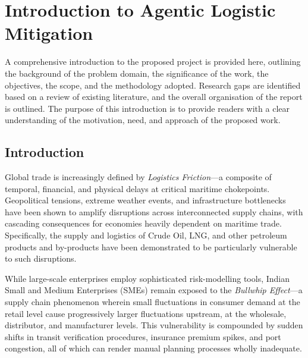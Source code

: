 \chapter{Introduction to Agentic Logistic Mitigation}
A comprehensive introduction to the proposed project is provided here, outlining the background of the problem domain, the significance of the work, the objectives, the scope, and the methodology adopted. Research gaps are identified based on a review of existing literature, and the overall organisation of the report is outlined. The purpose of this introduction is to provide readers with a clear understanding of the motivation, need, and approach of the proposed work.

\section[Introduction]{\textbf{Introduction}}
Global trade is increasingly defined by \textit{Logistics Friction}---a composite of temporal, financial, and physical delays at critical maritime chokepoints. Geopolitical tensions, extreme weather events, and infrastructure bottlenecks have been shown to amplify disruptions across interconnected supply chains, with cascading consequences for economies heavily dependent on maritime trade. Specifically, the supply and logistics of Crude Oil, LNG, and other petroleum products and by-products have been demonstrated to be particularly vulnerable to such disruptions.

While large-scale enterprises employ sophisticated risk-modelling tools, Indian Small and Medium Enterprises (SMEs) remain exposed to the \textit{Bullwhip Effect}---a supply chain phenomenon wherein small fluctuations in consumer demand at the retail level cause progressively larger fluctuations upstream, at the wholesale, distributor, and manufacturer levels. This vulnerability is compounded by sudden shifts in transit verification procedures, insurance premium spikes, and port congestion, all of which can render manual planning processes wholly inadequate.

